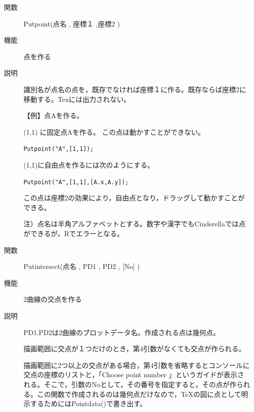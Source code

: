 \documentclass[papersize,a4paper,12pt,uplatex]{jsarticle}
\begin{document}
\begin{description}





\vspace{\baselineskip}
\hypertarget{putpoint}{}
\item[関数]Putpoint(点名 , 座標１ ,座標2 )
\item[機能]点を作る
\item[説明]識別名が点名の点を，既存でなければ座標１に作る。既存ならば座標2に移動する。Texには出力されない。

\vspace{\baselineskip}
【例】点Aを作る。

(1,1) に固定点Aを作る。 この点は動かすことができない。

\hspace{10mm} \verb|Putpoint("A",[1,1]);|
 
(1,1)に自由点を作るには次のようにする。

\hspace{10mm}\verb|Putpoint("A",[1,1],[A.x,A.y]);|
 
この点は座標2の効果により，自由点となり，ドラッグして動かすことができる。

\vspace{\baselineskip}
注）点名は半角アルファベットとする。数字や漢字でもCinderellaでは点ができるが，Rでエラーとなる。

\vspace{\baselineskip}
\hypertarget{putintersect}{}
\item[関数]Putintersect(点名 , PD1 , PD2 , [No] )
\item[機能]2曲線の交点を作る
\item[説明]PD1,PD2は2曲線のプロットデータ名。作成される点は幾何点。

描画範囲に交点が１つだけのとき，第4引数がなくても交点が作られる。

描画範囲に2つ以上の交点がある場合，第4引数を省略するとコンソールに交点の座標のリストと，「Choose point number 」というガイドが表示される。そこで，引数のNoとして，その番号を指定すると，その点が作られる。この関数で作成されるのは幾何点だけなので，\TeX の図に点として明示するためにはPointdata()で書き出す。


\end{description}
\end{document}
